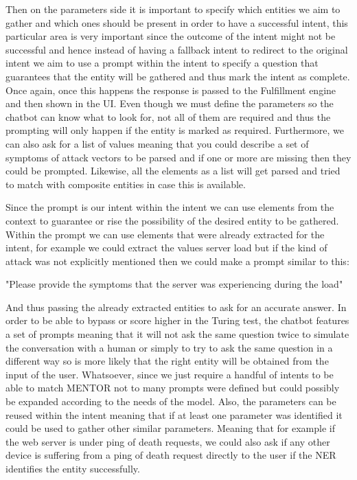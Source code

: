 Then on the parameters side it is important to specify which entities we aim to gather and which ones should be present in order to have a successful intent, this particular area is very important since the outcome of the intent might not be successful and hence instead of having a fallback intent to redirect to the original intent we aim to use a prompt within the intent to specify a question that guarantees that the entity will be gathered and thus mark the intent as complete. Once again, once this happens the response is passed to the Fulfillment engine and then shown in the UI. Even though we must define the parameters so the chatbot can know what to look for, not all of them are required and thus the prompting will only happen if the entity is marked as required. Furthermore, we can also ask for a list of values meaning that you could describe a set of symptoms of attack vectors to be parsed and if one or more are missing then they could be prompted. Likewise, all the elements as a list will get parsed and tried to match with composite entities in case this is available.

Since the prompt is our intent within the intent we can use elements from the context to guarantee or rise the possibility of the desired entity to be gathered. Within the prompt we can use elements that were already extracted for the intent, for example we could extract the values server load but if the kind of attack was not explicitly mentioned then we could make a prompt similar to this:

"Please provide the symptoms that the server was experiencing during the load"

And thus passing the already extracted entities to ask for an accurate answer. In order to be able to bypass or score higher in the Turing test, the chatbot features a set of prompts meaning that it will not ask the same question twice to simulate the conversation with a human or simply to try to ask the same question in a different way so is more likely that the right entity will be obtained from the input of the user. Whatsoever, since we just require a handful of intents to be able to match MENTOR not to many prompts were defined but could possibly be expanded according to the needs of the model. Also, the parameters can be reused within the intent meaning that if at least one parameter was identified it could be used to gather other similar parameters. Meaning that for example if the web server is under ping of death requests, we could also ask if any other device is suffering from a ping of death request directly to the user if the NER identifies the entity successfully.

